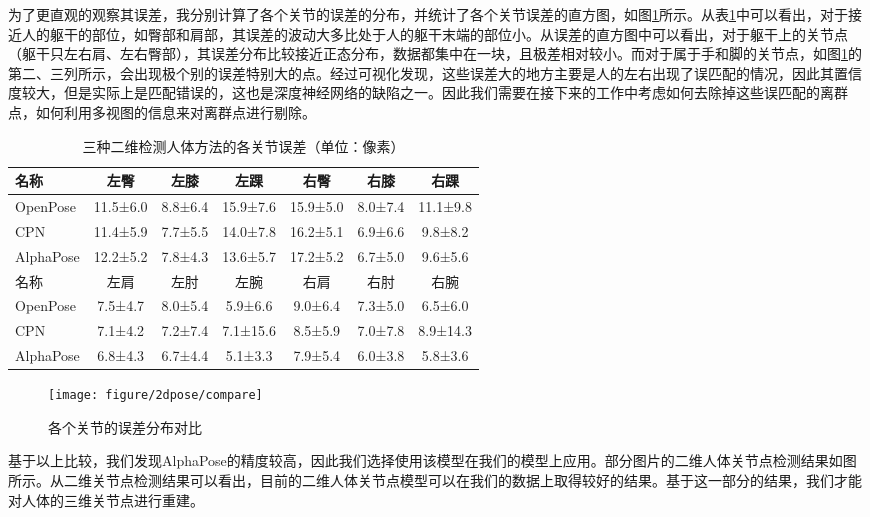 为了更直观的观察其误差，我分别计算了各个关节的误差的分布，并统计了各个关节误差的直方图，如图\ref{fig:2d-loss}所示。从表\ref{tab:2derrorjoint}中可以看出，对于接近人的躯干的部位，如臀部和肩部，其误差的波动大多比处于人的躯干末端的部位小。从误差的直方图中可以看出，对于躯干上的关节点（躯干只左右肩、左右臀部），其误差分布比较接近正态分布，数据都集中在一块，且极差相对较小。而对于属于手和脚的关节点，如图\ref{fig:2d-loss}的第二、三列所示，会出现极个别的误差特别大的点。经过可视化发现，这些误差大的地方主要是人的左右出现了误匹配的情况，因此其置信度较大，但是实际上是匹配错误的，这也是深度神经网络的缺陷之一。因此我们需要在接下来的工作中考虑如何去除掉这些误匹配的离群点，如何利用多视图的信息来对离群点进行剔除。
\begin{table}[H]
    \centering
    \begin{tabular}{lcccccc}
        \hline
         名称      & 左臀     & 左膝    & 左踝     & 右臀     & 右膝    & 右踝     \\
        \hline
         OpenPose  & 11.5±6.0 & 8.8±6.4 & 15.9±7.6 & 15.9±5.0 & 8.0±7.4 & 11.1±9.8 \\
         CPN       & 11.4±5.9 & 7.7±5.5 & 14.0±7.8 & 16.2±5.1 & 6.9±6.6 & 9.8±8.2  \\
         AlphaPose & 12.2±5.2 & 7.8±4.3 & 13.6±5.7 & 17.2±5.2 & 6.7±5.0 & 9.6±5.6  \\
        \hline
         名称      & 左肩     & 左肘    & 左腕     & 右肩     & 右肘    & 右腕     \\
        \hline
         OpenPose  & 7.5±4.7  & 8.0±5.4 & 5.9±6.6  & 9.0±6.4  & 7.3±5.0 & 6.5±6.0  \\
         CPN       & 7.1±4.2  & 7.2±7.4 & 7.1±15.6 & 8.5±5.9  & 7.0±7.8 & 8.9±14.3 \\
         AlphaPose & 6.8±4.3  & 6.7±4.4 & 5.1±3.3  & 7.9±5.4  & 6.0±3.8 & 5.8±3.6  \\
        \hline
        \end{tabular}
    \caption{三种二维检测人体方法的各关节误差（单位：像素）\label{tab:2derrorjoint}}
\end{table}


\begin{figure}[htbp]
    \centering
    \texttt{[image: figure/2dpose/compare]}
    \caption{\label{fig:2d-loss} 各个关节的误差分布对比}
\end{figure}

基于以上比较，我们发现AlphaPose的精度较高，因此我们选择使用该模型在我们的模型上应用。部分图片的二维人体关节点检测结果如图所示。从二维关节点检测结果可以看出，目前的二维人体关节点模型可以在我们的数据上取得较好的结果。基于这一部分的结果，我们才能对人体的三维关节点进行重建。

